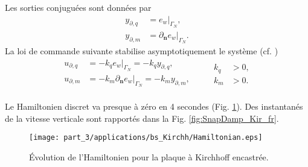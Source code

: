 Les sorties conjuguées sont données par
\begin{equation*}
\begin{aligned}
y_{\partial, q} &= e_w|_{\Gamma_N}, \\
y_{\partial, m} &=\partial_{\bm{n}} e_w|_{\Gamma_N}.
\end{aligned}
\end{equation*}
La loi de commande suivante stabilise asymptotiquement le système (cf. \cite{lagnese1989})
\begin{equation*}
\begin{aligned}
u_{\partial, q} &= - k_q e_w|_{\Gamma_N} = - k_q y_{\partial, q}, \\
u_{\partial, m} &= - k_m \partial_{\bm{n}} e_w|_{\Gamma_N}  = - k_m y_{\partial, m}, \\
\end{aligned} \qquad
\begin{aligned}
k_q&>0, \\
k_m&>0.
\end{aligned}
\end{equation*}

Le Hamiltonien discret va presque à zéro en 4 secondes (Fig. \ref{fig:H_bs_Kirchhoff_fr}). Des instantanés de la vitesse verticale sont rapportés dans la Fig. \ref{fig:SnapDamp_Kir_fr}.

\begin{figure}[htb]
	\centering
	\texttt{[image: part\_3/applications/bs\_Kirchh/Hamiltonian.eps]}
	\caption{Évolution de l'Hamiltonien pour la plaque à Kirchhoff encastrée.}
	\label{fig:H_bs_Kirchhoff_fr}
\end{figure}

\begin{figure*}[p]
	\centering
	\hfil
	\hfil
	\hfil
	\hfil
	\caption{Instantanés à différents moments de la simulation de la plaque de Kirchhoff contrôlée au bord.}
	\label{fig:SnapDamp_Kir_fr}
	\hfil
\end{figure*}

